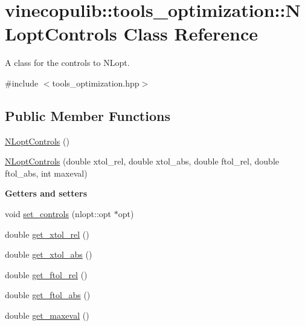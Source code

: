 \hypertarget{classvinecopulib_1_1tools__optimization_1_1_n_lopt_controls}{\section{vinecopulib\+:\+:tools\+\_\+optimization\+:\+:N\+Lopt\+Controls Class Reference}
\label{classvinecopulib_1_1tools__optimization_1_1_n_lopt_controls}
}


A class for the controls to N\+Lopt.  




{\ttfamily \#include $<$tools\+\_\+optimization.\+hpp$>$}

\subsection*{Public Member Functions}
\begin{DoxyCompactItemize}
\item 
\hyperlink{classvinecopulib_1_1tools__optimization_1_1_n_lopt_controls_aaa09bb2bbf7dcbfcaaae4921b053c502}{N\+Lopt\+Controls} ()
\item 
\hyperlink{classvinecopulib_1_1tools__optimization_1_1_n_lopt_controls_aa8f12e7923d8dc5a28a49c6f23f204db}{N\+Lopt\+Controls} (double xtol\+\_\+rel, double xtol\+\_\+abs, double ftol\+\_\+rel, double ftol\+\_\+abs, int maxeval)
\end{DoxyCompactItemize}
\begin{Indent}{\bf Getters and setters}\par
\begin{DoxyCompactItemize}
\item 
void \hyperlink{classvinecopulib_1_1tools__optimization_1_1_n_lopt_controls_ab48d26a305e4ac805249605a60db4257}{set\+\_\+controls} (nlopt\+::opt $\ast$opt)
\item 
double \hyperlink{classvinecopulib_1_1tools__optimization_1_1_n_lopt_controls_a27400ff85f220911c2937ca16dd51697}{get\+\_\+xtol\+\_\+rel} ()
\item 
double \hyperlink{classvinecopulib_1_1tools__optimization_1_1_n_lopt_controls_a65494c81f12ff414259fd72593c545a6}{get\+\_\+xtol\+\_\+abs} ()
\item 
double \hyperlink{classvinecopulib_1_1tools__optimization_1_1_n_lopt_controls_a583ccb19e633f7408a1311aa250aabf7}{get\+\_\+ftol\+\_\+rel} ()
\item 
double \hyperlink{classvinecopulib_1_1tools__optimization_1_1_n_lopt_controls_ae96aba7bd7580c68216419722cafd3ec}{get\+\_\+ftol\+\_\+abs} ()
\item 
double \hyperlink{classvinecopulib_1_1tools__optimization_1_1_n_lopt_controls_a965d9632e85fae19778694bdfcbe1ea5}{get\+\_\+maxeval} ()
\end{DoxyCompactItemize}
\end{Indent}


